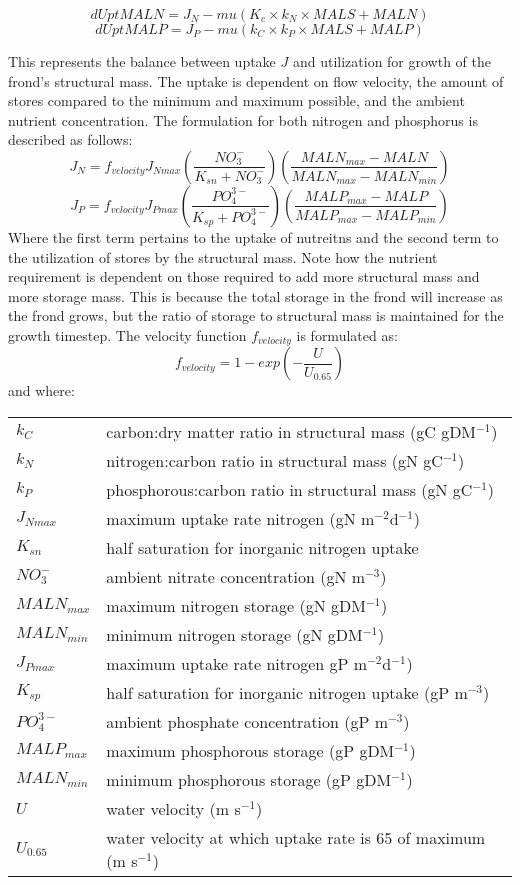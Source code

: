 \documentclass{deltares_manual}
\begin{document}
\[dUptMALN = J_N - mu(K_c \times k_N \times MALS + MALN)\]
\[dUptMALP = J_P - mu(k_C \times k_P \times MALS + MALP)\]

This represents the balance between uptake $J$ and utilization for growth of the frond's structural mass. The uptake is dependent on flow velocity, the amount of stores compared to the minimum and maximum possible, and the ambient nutrient concentration. The formulation for both nitrogen and phosphorus is described as follows:
\[J_N = f_{velocity}J_{Nmax}(\frac{NO_3^-}{K_{sn}+NO_3^-})(\frac{MALN_{max}-MALN}{MALN_{max}-MALN_{min}})\]
\[J_P = f_{velocity}J_{Pmax}(\frac{PO_4^{3-}}{K_{sp}+PO_4^{3-}})(\frac{MALP_{max}-MALP}{MALP_{max}-MALP_{min}})\]
Where the first term pertains to the uptake of nutreitns and the second term to the utilization of stores by the structural mass. Note how the nutrient requirement is dependent on those required to add more structural mass and more storage mass. This is because the total storage in the frond will increase as the frond grows, but the ratio of storage to structural mass is maintained for the growth timestep. The velocity function $f_{velocity}$ is formulated as:
\[f_{velocity} = 1-exp(-\frac{U}{U_{0.65}})\]
and where:\\
\begin{tabular}{ll}
$k_C$        & carbon:dry matter ratio in structural mass (gC gDM$^{-1}$)\\
$k_N$        & nitrogen:carbon ratio in structural mass (gN gC$^{-1}$)\\
$k_P$        & phosphorous:carbon ratio in structural mass (gN gC$^{-1}$)\\
$J_{Nmax}$   & maximum uptake rate nitrogen (gN m$^{-2}$d$^{-1}$)\\
$K_{sn}$     & half saturation for inorganic nitrogen uptake\\
$NO_3^-$     & ambient nitrate concentration (gN m$^{-3}$)\\
$MALN_{max}$ & maximum nitrogen storage (gN gDM$^{-1}$)\\
$MALN_{min}$ & minimum nitrogen storage (gN gDM$^{-1}$)\\
$J_{Pmax}$   & maximum uptake rate nitrogen gP m$^{-2}$d$^{-1}$)\\
$K_{sp}$     & half saturation for inorganic nitrogen uptake (gP m$^{-3}$)\\
$PO_4^{3-}$  & ambient phosphate concentration (gP m$^{-3}$)\\
$MALP_{max}$ & maximum phosphorous storage (gP gDM$^{-1}$)\\
$MALN_{min}$ & minimum phosphorous storage (gP gDM$^{-1}$)\\
$U$          & water velocity (m s$^{-1}$)\\
$U_{0.65}$   & water velocity at which uptake rate is 65 of maximum (m s$^{-1}$)\\
\end{tabular}
\end{document}
